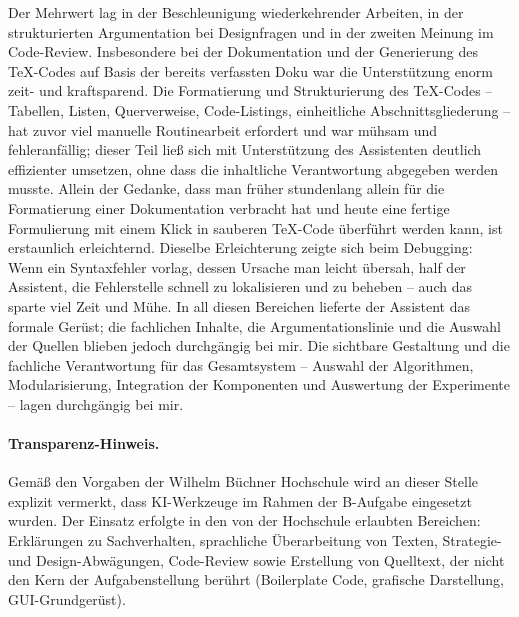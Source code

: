 Der Mehrwert lag in der Beschleunigung wiederkehrender Arbeiten, in der strukturierten Argumentation bei Designfragen und in der zweiten Meinung im Code-Review. Insbesondere bei der Dokumentation und der Generierung des \TeX-Codes auf Basis der bereits verfassten Doku war die Unterstützung enorm zeit- und kraftsparend. Die Formatierung und Strukturierung des \TeX-Codes -- Tabellen, Listen, Querverweise, Code-Listings, einheitliche Abschnittsgliederung -- hat zuvor viel manuelle Routinearbeit erfordert und war mühsam und fehleranfällig; dieser Teil ließ sich mit Unterstützung des Assistenten deutlich effizienter umsetzen, ohne dass die inhaltliche Verantwortung abgegeben werden musste. Allein der Gedanke, dass man früher stundenlang allein für die Formatierung einer Dokumentation verbracht hat und heute eine fertige Formulierung mit einem Klick in sauberen \TeX-Code überführt werden kann, ist erstaunlich erleichternd. Dieselbe Erleichterung zeigte sich beim Debugging: Wenn ein Syntaxfehler vorlag, dessen Ursache man leicht übersah, half der Assistent, die Fehlerstelle schnell zu lokalisieren und zu beheben -- auch das sparte viel Zeit und Mühe. In all diesen Bereichen lieferte der Assistent das formale Gerüst; die fachlichen Inhalte, die Argumentationslinie und die Auswahl der Quellen blieben jedoch durchgängig bei mir. Die sichtbare Gestaltung und die fachliche Verantwortung für das Gesamtsystem -- Auswahl der Algorithmen, Modularisierung, Integration der Komponenten und Auswertung der Experimente -- lagen durchgängig bei mir.

\paragraph{Transparenz-Hinweis.}
Gemäß den Vorgaben der Wilhelm Büchner Hochschule wird an dieser Stelle explizit vermerkt, dass \acs{KI}-Werkzeuge im Rahmen der B-Aufgabe eingesetzt wurden. Der Einsatz erfolgte in den von der Hochschule erlaubten Bereichen: Erklärungen zu Sachverhalten, sprachliche Überarbeitung von Texten, Strategie- und Design-Abwägungen, Code-Review sowie Erstellung von Quelltext, der nicht den Kern der Aufgabenstellung berührt (Boilerplate Code, grafische Darstellung, \acs{GUI}-Grundgerüst).

